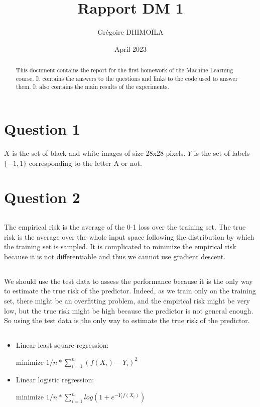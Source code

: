 \documentclass{article}
\title{Rapport DM 1}
\author{Grégoire DHIMOÏLA}
\date{April 2023}
\begin{document}
\maketitle

\begin{abstract}
    This document contains the report for the first homework of the Machine Learning course. It contains the answers to the questions and links to the code used to answer them. It also contains the main results of the experiments.
\end{abstract}

\section{Question 1}

$X$ is the set of black and white images of size 28x28 pixels. $Y$ is the set of labels $\{-1,1\}$ corresponding to the letter A or not.

\section{Question 2}

\subsection{}

The empirical risk is the average of the 0-1 loss over the training set. The true risk is the average over the whole input space following the distribution by which the training set is sampled. It is complicated to minimize the empirical risk because it is not differentiable and thus we cannot use gradient descent.

\subsection{}

We should use the test data to assess the performance because it is the only way to estimate the true risk of the predictor. Indeed, as we train only on the training set, there might be an overfitting problem, and the empirical risk might be very low, but the true risk might be high because the predictor is not general enough. So using the test data is the only way to estimate the true risk of the predictor.

\subsection{}
\begin{itemize}
    \item 
Linear least square regression:

minimize $1/n * \sum_{i=1}^n (f(X_i) - Y_i)^2$
\item 
Linear logistic regression:

minimize $1/n * \sum_{i=1}^n log(1 + e^{-Y_i f(X_i)})$
\end{itemize}
\end{document}
